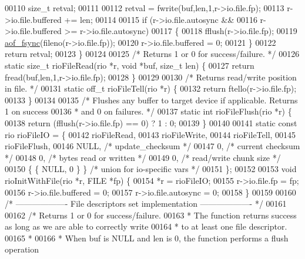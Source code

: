 \begin{DoxyCode}
00110     size\_t retval;
00111 
00112     retval = fwrite(buf,len,1,r->io.file.fp);
00113     r->io.file.buffered += len;
00114 
00115     \textcolor{keywordflow}{if} (r->io.file.autosync &&
00116         r->io.file.buffered >= r->io.file.autosync)
00117     \{
00118         fflush(r->io.file.fp);
00119         \hyperlink{config_8h_af5994c643c434574580bb7816af82cad}{aof\_fsync}(fileno(r->io.file.fp));
00120         r->io.file.buffered = 0;
00121     \}
00122     \textcolor{keywordflow}{return} retval;
00123 \}
00124 
00125 \textcolor{comment}{/* Returns 1 or 0 for success/failure. */}
00126 \textcolor{keyword}{static} size\_t rioFileRead(rio *r, \textcolor{keywordtype}{void} *buf, size\_t len) \{
00127     \textcolor{keywordflow}{return} fread(buf,len,1,r->io.file.fp);
00128 \}
00129 
00130 \textcolor{comment}{/* Returns read/write position in file. */}
00131 \textcolor{keyword}{static} off\_t rioFileTell(rio *r) \{
00132     \textcolor{keywordflow}{return} ftello(r->io.file.fp);
00133 \}
00134 
00135 \textcolor{comment}{/* Flushes any buffer to target device if applicable. Returns 1 on success}
00136 \textcolor{comment}{ * and 0 on failures. */}
00137 \textcolor{keyword}{static} \textcolor{keywordtype}{int} rioFileFlush(rio *r) \{
00138     \textcolor{keywordflow}{return} (fflush(r->io.file.fp) == 0) ? 1 : 0;
00139 \}
00140 
00141 \textcolor{keyword}{static} \textcolor{keyword}{const} rio rioFileIO = \{
00142     rioFileRead,
00143     rioFileWrite,
00144     rioFileTell,
00145     rioFileFlush,
00146     NULL,           \textcolor{comment}{/* update\_checksum */}
00147     0,              \textcolor{comment}{/* current checksum */}
00148     0,              \textcolor{comment}{/* bytes read or written */}
00149     0,              \textcolor{comment}{/* read/write chunk size */}
00150     \{ \{ NULL, 0 \} \} \textcolor{comment}{/* union for io-specific vars */}
00151 \};
00152 
00153 \textcolor{keywordtype}{void} rioInitWithFile(rio *r, FILE *fp) \{
00154     *r = rioFileIO;
00155     r->io.file.fp = fp;
00156     r->io.file.buffered = 0;
00157     r->io.file.autosync = 0;
00158 \}
00159 
00160 \textcolor{comment}{/* ------------------- File descriptors set implementation ------------------- */}
00161 
00162 \textcolor{comment}{/* Returns 1 or 0 for success/failure.}
00163 \textcolor{comment}{ * The function returns success as long as we are able to correctly write}
00164 \textcolor{comment}{ * to at least one file descriptor.}
00165 \textcolor{comment}{ *}
00166 \textcolor{comment}{ * When buf is NULL and len is 0, the function performs a flush operation}

\end{DoxyCode}
